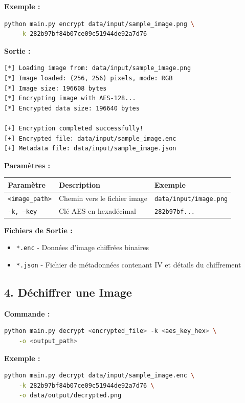 \documentclass[12pt,a4paper]{report}
\begin{document}
\textbf{Exemple :}
\begin{lstlisting}[language=bash]
python main.py encrypt data/input/sample_image.png \
    -k 282b97bf84b07ce09c51944de92a7d76
\end{lstlisting}

\textbf{Sortie :}
\begin{lstlisting}
[*] Loading image from: data/input/sample_image.png
[*] Image loaded: (256, 256) pixels, mode: RGB
[*] Image size: 196608 bytes
[*] Encrypting image with AES-128...
[*] Encrypted data size: 196640 bytes

[+] Encryption completed successfully!
[+] Encrypted file: data/input/sample_image.enc
[+] Metadata file: data/input/sample_image.json
\end{lstlisting}

\textbf{Paramètres :}
\begin{table}[H]
    \centering
    \begin{tabular}{|l|l|l|}
    \hline
    \textbf{Paramètre} & \textbf{Description} & \textbf{Exemple} \\
    \hline
    \texttt{<image\_path>} & Chemin vers le fichier image & \texttt{data/input/image.png} \\
    \texttt{-k, --key} & Clé AES en hexadécimal & \texttt{282b97bf...} \\
    \hline
    \end{tabular}
\end{table}

\textbf{Fichiers de Sortie :}
\begin{itemize}
    \item \texttt{*.enc} - Données d'image chiffrées binaires
    \item \texttt{*.json} - Fichier de métadonnées contenant IV et détails du chiffrement
\end{itemize}

\subsection{4. Déchiffrer une Image}

\textbf{Commande :}
\begin{lstlisting}[language=bash]
python main.py decrypt <encrypted_file> -k <aes_key_hex> \
    -o <output_path>
\end{lstlisting}

\textbf{Exemple :}
\begin{lstlisting}[language=bash]
python main.py decrypt data/input/sample_image.enc \
    -k 282b97bf84b07ce09c51944de92a7d76 \
    -o data/output/decrypted.png
\end{lstlisting}
\end{document}
